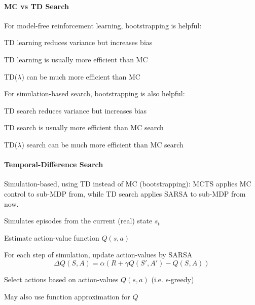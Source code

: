 \documentclass[10pt]{report}
\begin{document}
\paragraph{MC vs TD Search} For model-free reinforcement learning, bootstrapping is helpful:
\begin{list}{}{}
	\item TD learning reduces variance but increases bias
	\item TD learning is usually more efficient than MC
	\item TD($\lambda$) can be much more efficient than MC
\end{list}
For simulation-based search, bootstrapping is also helpful:
\begin{list}{}{}
	\item TD search reduces variance but increases bias
	\item TD search is usually more efficient than MC search
	\item TD($\lambda$) search can be much more efficient than MC search
\end{list}
\paragraph{Temporal-Difference Search} Simulation-based, using TD instead of MC (bootstrapping): MCTS applies MC control to sub-MDP from, while TD search applies SARSA to sub-MDP from now.
\begin{list}{}{}
	\item Simulates episodes from the current (real) state $s_t$
	\item Estimate action-value function $Q(s,a)$
	\item For each step of simulation, update action-values by SARSA
	$$\Delta Q(S,A)=\alpha(R+\gamma Q(S',A') - Q(S,A))$$
	\item Select actions based on action-values $Q(s,a)$ (i.e. $\epsilon$-greedy)
	\item May also use function approximation for $Q$
\end{list}
\end{document}
